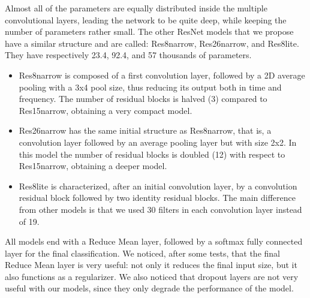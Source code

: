 Almost all of the parameters are equally distributed inside the multiple convolutional layers, leading the network to be quite deep, while keeping the number of parameters rather small.
The other ResNet models that we propose have a similar structure and are called: Res8narrow, Res26narrow, and Res8lite. They have respectively 23.4, 92.4, and 57 thousands of parameters.
\begin{itemize}
  \item Res8narrow is composed of a first convolution layer, followed by a 2D average pooling with a 3x4 pool size, thus reducing its output both in time and frequency.
The number of residual blocks is halved (3) compared to Res15narrow, obtaining a very compact model.

  \item Res26narrow has the same initial structure as Res8narrow, that is, a convolution layer followed by an average pooling layer but with size 2x2. 
In this model the number of residual blocks is doubled (12) with respect to Res15narrow, obtaining a deeper model.

  \item Res8lite is characterized, after an initial convolution layer, by a convolution residual block followed by two identity residual blocks. The main difference from other models is that we used 30 filters in each convolution layer instead of 19. 

\end{itemize}
All models end with a Reduce Mean layer, followed by a softmax fully connected layer for the final classification.
We noticed, after some tests, that the final Reduce Mean layer is very useful: not only it  reduces the final input size, but it also functions as a regularizer. We also noticed that dropout layers are not very useful with our models, since they only degrade the performance of the model.

